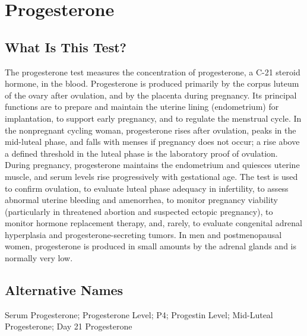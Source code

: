 \chapter{Progesterone}

\section*{What Is This Test?}
The progesterone test measures the concentration of progesterone, a C-21 steroid hormone, in the blood. Progesterone is produced primarily by the corpus luteum of the ovary after ovulation, and by the placenta during pregnancy. Its principal functions are to prepare and maintain the uterine lining (endometrium) for implantation, to support early pregnancy, and to regulate the menstrual cycle. In the nonpregnant cycling woman, progesterone rises after ovulation, peaks in the mid-luteal phase, and falls with menses if pregnancy does not occur; a rise above a defined threshold in the luteal phase is the laboratory proof of ovulation. During pregnancy, progesterone maintains the endometrium and quiesces uterine muscle, and serum levels rise progressively with gestational age. The test is used to confirm ovulation, to evaluate luteal phase adequacy in infertility, to assess abnormal uterine bleeding and amenorrhea, to monitor pregnancy viability (particularly in threatened abortion and suspected ectopic pregnancy), to monitor hormone replacement therapy, and, rarely, to evaluate congenital adrenal hyperplasia and progesterone-secreting tumors. In men and postmenopausal women, progesterone is produced in small amounts by the adrenal glands and is normally very low.

\section*{Alternative Names}
Serum Progesterone; Progesterone Level; P4; Progestin Level; Mid-Luteal Progesterone; Day 21 Progesterone

